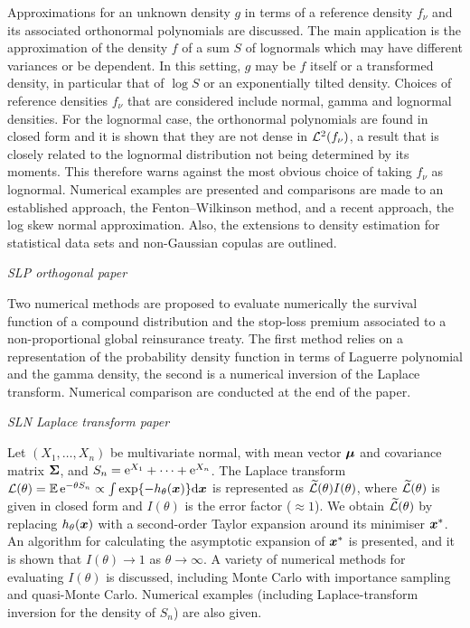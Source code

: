 Approximations for an unknown density $g$ in terms of a reference density $f_\nu$
and its associated orthonormal polynomials are discussed. The main application is
the approximation of the density $f$ of a sum $S$ of lognormals which may have different
variances or be dependent. In this setting, $g$ may be $f$ itself or a transformed
density, in particular that of $\log S$ or an exponentially tilted density.  Choices
of reference densities $f_\nu$ that are considered include normal, gamma and lognormal densities.
For the lognormal case, the orthonormal polynomials are found in closed form
and it is shown that they are not dense in $\mathcal{L}^2(f_\nu)$, a result that is closely related
to the lognormal distribution not being determined by its moments. This therefore warns against the most
obvious choice of taking $f_\nu$ as lognormal. Numerical examples are presented
and comparisons are made to an established approach, the Fenton--Wilkinson method, and a recent approach, the
log skew normal approximation. Also, the extensions to density estimation for statistical data sets and non-Gaussian copulas
are outlined.

\emph{SLP orthogonal paper}

Two numerical methods are proposed to evaluate numerically the survival function of a compound distribution and the stop-loss premium associated to a non-proportional global reinsurance treaty. The first method relies on a representation of the probability density function in terms of Laguerre polynomial and the gamma density, the second is a numerical inversion of the Laplace transform. Numerical comparison are conducted at the end of the paper.

\emph{SLN Laplace transform paper}

Let $(X_1, \dots, X_n)$ be multivariate normal, with mean vector $\bm{\mu}$ and
covariance matrix $\bm{\Sigma}$, and $S_n=\mathrm{e}^{X_1}+\cdots+\mathrm{e}^{X_n}$. The
Laplace transform ${\cal L}(\theta)=\operatorname{{\mathbb E}}\mathrm{e}^{-\theta S_n}\propto \int
\exp\{-h_\theta(\bm{x})\} \mathrm{d} \bm{x}$ is represented as $\widetilde {\cal
  L}(\theta)I(\theta)$, where $\widetilde {\cal L}(\theta)$ is given in closed
form and $I(\theta)$ is the error factor ($\approx 1$). We obtain $\widetilde
{\cal L}(\theta)$ by replacing $h_\theta(\bm{x})$ with a second-order Taylor
expansion around its minimiser $\bm{x}^*$. An algorithm for calculating the
asymptotic expansion of $\bm{x}^*$ is presented, and it is shown that
$I(\theta)\to 1$ as $\theta\to\infty$.  A variety of numerical methods for
evaluating $I(\theta)$ is discussed, including Monte Carlo with importance
sampling and quasi-Monte Carlo. Numerical examples (including
Laplace-transform inversion for the density of $S_n$) are also given.

